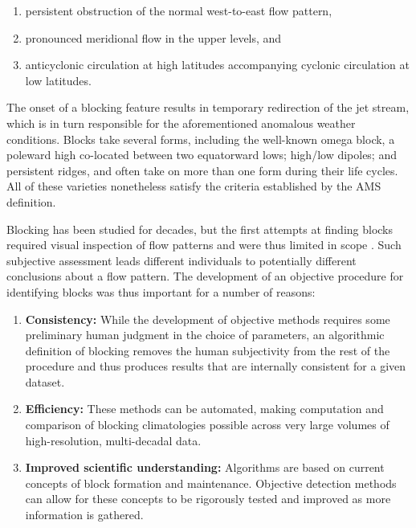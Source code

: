 \documentclass[smallextended]{svjour3}       %
\numberwithin{equation}{section}
\begin{document}
\begin{enumerate}
\item persistent obstruction of the normal west-to-east flow pattern,
\item pronounced meridional flow in the upper levels, and
\item anticyclonic circulation at high latitudes accompanying cyclonic circulation at low latitudes.
\end{enumerate}

The onset of a blocking feature results in temporary redirection of the jet stream, which is in turn responsible for the aforementioned anomalous weather conditions. Blocks take several forms, including the well-known omega block, a poleward high co-located between two equatorward lows; high/low dipoles; and persistent ridges{\color{blue}, and often take on more than one form during their life cycles}. 
All of these varieties nonetheless satisfy the criteria established by the AMS definition. 

Blocking has been studied for decades, but the first attempts at finding blocks required visual inspection of flow patterns and were thus limited in scope \citep{rex_blocking_1950}.  Such subjective assessment leads different individuals to potentially different conclusions about a flow pattern. The development of an objective procedure for identifying blocks was thus important for a number of reasons:

\begin{enumerate}
\item \textbf{Consistency:} While the development of objective methods requires some preliminary human judgment in the choice of parameters, an algorithmic definition of blocking removes the human subjectivity from the rest of the procedure and thus produces results that are internally consistent for a given dataset.
\item \textbf{Efficiency:} These methods can be automated, making computation and comparison of blocking climatologies possible across very large volumes of high-resolution, multi-decadal data.
\item \textbf{Improved scientific understanding:} Algorithms are based on current concepts of block formation and maintenance. Objective detection methods can allow for these concepts to be rigorously tested and improved as more information is gathered.
\end{enumerate}
\end{document}
